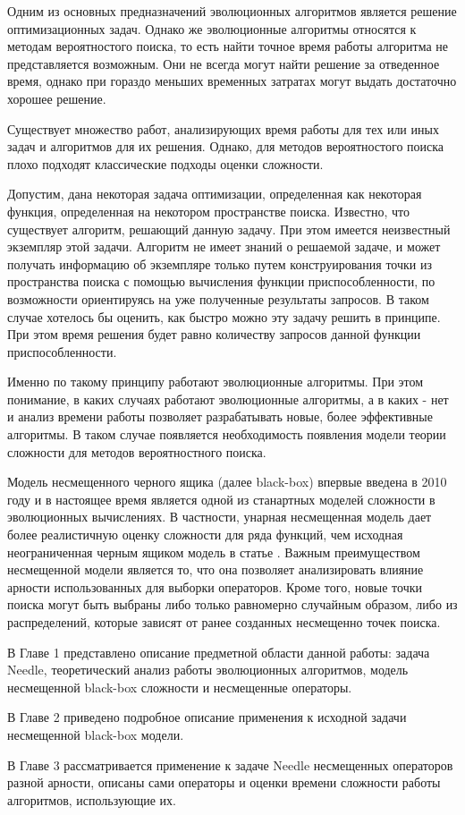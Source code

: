 \startprefacepage

Одним из основных предназначений эволюционных алгоритмов является решение оптимизационных задач. Однако же эволюционные алгоритмы относятся к методам вероятностого поиска, то есть найти точное время работы алгоритма не представляется возможным. Они не всегда могут найти решение за отведенное время, однако при гораздо меньших временных затратах могут выдать достаточно хорошее решение. 

Существует множество работ, анализирующих время работы для тех или иных задач и алгоритмов для их решения. Однако, для методов вероятностого поиска плохо подходят классические подходы оценки сложности. 


Допустим, дана некоторая задача оптимизации, определенная как некоторая функция, определенная на некотором пространстве поиска. Известно, что существует алгоритм, решающий данную задачу. При этом имеется неизвестный экземпляр этой задачи. Алгоритм не имеет знаний о решаемой задаче, и может получать информацию об экземпляре только путем конструирования точки из пространства поиска с помощью вычисления функции приспособленности, по возможности ориентируясь на уже полученные результаты запросов. 
В таком случае хотелось бы оценить, как быстро можно эту задачу решить в принципе. При этом время решения будет равно количеству запросов данной функции приспособленности.


Именно по такому принципу работают эволюционные алгоритмы. При этом понимание, в каких случаях работают эволюционные алгоритмы, а в каких - нет и анализ времени работы позволяет разрабатывать новые, более эффективные алгоритмы. В таком случае появляется необходимость появления модели теории сложности для методов вероятностного поиска. 


Модель несмещенного черного ящика (далее black-box) впервые введена в 2010 году \cite{1} и в настоящее время является одной из станартных моделей сложности в эволюционных вычислениях. В частности, унарная несмещенная модель дает более реалистичную оценку сложности для ряда функций, чем исходная неограниченная черным ящиком модель в статье \cite{2}.   
Важным преимуществом несмещенной модели является то, что она позволяет анализировать влияние арности использованных для выборки операторов. Кроме того, новые точки поиска могут быть выбраны либо только равномерно случайным образом, либо из распределений, которые зависят от ранее созданных несмещенно точек поиска. 


  В Главе 1 представлено описание предметной области данной работы: задача Needle, теоретический анализ работы эволюционных алгоритмов, модель несмещенной black-box сложности и несмещенные операторы. 
  
  В Главе 2 приведено подробное описание применения к исходной задачи несмещенной black-box модели.
  
  В Главе 3 рассматривается применение к задаче Needle несмещенных операторов разной арности, описаны сами операторы и оценки времени сложности работы алгоритмов, использующие их. 
  
  
  
  